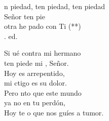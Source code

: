 \begin{cancion}%
	\begin{chorus}%
	n piedad, ten piedad, ten piedad\\
	Señor ten pie\\
	otra  he pado con Ti (**)\\
	. ed.\\
	\end{chorus}%
	Si ué contra mi hermano \\
	ten piede mi , Señor.\\
	Hoy es arrepentido, \\
	mi ctigo es su dolor.\\
	Pero nto que este mundo \\
	ya no  en tu perdón,\\
	Hoy te o que nos guíes a tumor.\\
\end{cancion}%
